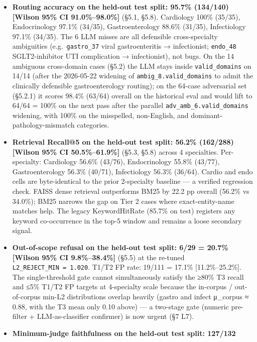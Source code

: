 \documentclass[
  american,
  a4paper,
]{article}
\providecommand{\tightlist}{%
  \setlength{\itemsep}{0pt}\setlength{\parskip}{0pt}}
\begin{document}
\begin{itemize}
\tightlist
\item
  \textbf{Routing accuracy on the held-out test split: 95.7\% (134/140)
  {[}Wilson 95\% CI 91.0\%--98.0\%{]}} (§5.1, §5.8). Cardiology 100\%
  (35/35), Endocrinology 97.1\% (34/35), Gastroenterology 88.6\%
  (31/35), Infectiology 97.1\% (34/35). The 6 LLM misses are all
  defensible cross-specialty ambiguities (e.g.~\texttt{gastro\_37} viral
  gastroenteritis → infectionist; \texttt{endo\_48} SGLT2-inhibitor UTI
  complication → infectionist), not bugs. On the 14 ambiguous
  cross-domain cases (§5.2) the LLM stays inside \texttt{valid\_domains}
  on 14/14 (after the 2026-05-22 widening of
  \texttt{ambig\_8.valid\_domains} to admit the clinically defensible
  gastroenterology routing); on the 64-case adversarial set (§5.2.1) it
  scores 98.4\% (63/64) overall on the historical eval and would lift to
  64/64 = 100\% on the next pass after the parallel
  \texttt{adv\_amb\_6.valid\_domains} widening, with 100\% on the
  misspelled, non-English, and dominant-pathology-mismatch categories.
\item
  \textbf{Retrieval Recall@5 on the held-out test split: 56.2\%
  (162/288) {[}Wilson 95\% CI 50.5\%--61.9\%{]}} (§5.3, §5.8) across 4
  specialties. Per-specialty: Cardiology 56.6\% (43/76), Endocrinology
  55.8\% (43/77), Gastroenterology 56.3\% (40/71), Infectiology 56.3\%
  (36/64). Cardio and endo cells are byte-identical to the prior
  2-specialty baseline --- a verified regression check. FAISS dense
  retrieval outperforms BM25 by 22.2 pp overall (56.2\% vs 34.0\%); BM25
  narrows the gap on Tier 2 cases where exact-entity-name matches help.
  The legacy KeywordHitRate (85.7\% on test) registers any keyword
  co-occurrence in the top-5 window and remains a loose secondary
  signal.
\item
  \textbf{Out-of-scope refusal on the held-out test split: 6/29 = 20.7\%
  {[}Wilson 95\% CI 9.8\%--38.4\%{]}} (§5.5) at the re-tuned
  \texttt{L2\_REJECT\_MIN\ =\ 1.020}. T1/T2 FP rate: 19/111 = 17.1\%
  {[}11.2\%--25.2\%{]}. The single-threshold gate cannot simultaneously
  satisfy the ≥80\% T3 recall and ≤5\% T1/T2 FP targets at 4-specialty
  scale because the in-corpus / out-of-corpus min-L2 distributions
  overlap heavily (gastro and infect μ\_corpus ≈ 0.88, with the T3 mean
  only 0.10 above) --- a two-stage gate (numeric pre-filter +
  LLM-as-classifier confirmer) is now urgent (§7 L7).
\item
  \textbf{Minimum-judge faithfulness on the held-out test split: 127/132
}
\end{itemize}
\end{document}
